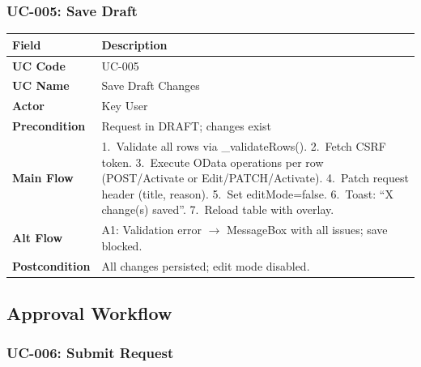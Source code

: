 \documentclass[12pt,a4paper]{report}
\begin{document}
\subsubsection{UC-005: Save Draft}

\begin{longtable}{|>{\bfseries}p{2.8cm}|p{12cm}|}
  \hline
  \rowcolor{tableheadpeach}
  \textbf{Field} & \textbf{Description} \\ \hline
  \endhead \hline \endfoot
  UC Code       & UC-005 \\ \hline
  UC Name       & Save Draft Changes \\ \hline
  Actor         & Key User \\ \hline
  Precondition  & Request in DRAFT; changes exist \\ \hline
  Main Flow     & 1.~Validate all rows via \_validateRows().
                  2.~Fetch CSRF token.
                  3.~Execute OData operations per row (POST/Activate or Edit/PATCH/Activate).
                  4.~Patch request header (title, reason).
                  5.~Set editMode=false.
                  6.~Toast: ``X change(s) saved''.
                  7.~Reload table with overlay. \\ \hline
  Alt Flow      & A1: Validation error $\rightarrow$ MessageBox with all issues; save blocked. \\ \hline
  Postcondition & All changes persisted; edit mode disabled. \\ \hline
\end{longtable}


\subsection{Approval Workflow}

\subsubsection{UC-006: Submit Request}
\end{document}
